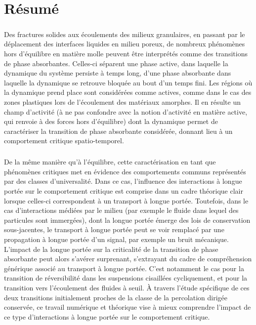 \thispagestyle{empty}

\section*{Résumé}

\subparagraph{}Des fractures solides aux écoulements des milieux granulaires, en passant par le déplacement des interfaces liquides en milieu poreux, de nombreux phénomènes hors d’équilibre en matière molle peuvent être interprétés comme des transitions de phase absorbantes. Celles-ci séparent une phase active, dans laquelle la dynamique du système persiste à temps long, d'une phase absorbante dans laquelle la dynamique se retrouve bloquée au bout d’un temps fini. Les régions où la dynamique prend place sont considérées comme actives, comme dans le cas des zones plastiques lors de l'écoulement des matériaux amorphes. Il en résulte un champ d’activité (à ne pas confondre avec la notion d’activité en matière active, qui renvoie à des forces hors d’équilibre) dont la dynamique permet de caractériser la transition de phase absorbante considérée, donnant lieu à un comportement critique spatio-temporel.

\subparagraph{}De la même manière qu'à l'équilibre, cette caractérisation en tant que phénomènes critiques met en évidence des comportements communs représentés par des classes d'universalité. Dans ce cas, l'influence des interactions à longue portée sur le comportement critique est comprise dans un cadre théorique clair lorsque celles-ci correspondent à un transport à longue portée. Toutefois, dans le cas d'interactions médiées par le milieu (par exemple le fluide dans lequel des particules sont immergées), dont la longue portée émerge des lois de conservation sous-jacentes, le transport à longue portée peut se voir remplacé par une propagation à longue portée d’un signal, par exemple un bruit mécanique. L'impact de la longue portée sur la criticalité de la transition de phase absorbante peut alors s'avérer surprenant, s'extrayant du cadre de compréhension générique associé au transport à longue portée. C'est notamment le cas pour la transition de réversibilité dans les suspensions cisaillées cycliquement, et pour la transition vers l'écoulement des fluides à seuil. \`A travers l'étude spécifique de ces deux transitions initialement proches de la classe de la percolation dirigée conservée, ce travail numérique et théorique vise à mieux comprendre l'impact de ce type d'interactions à longue portée sur le comportement critique.

